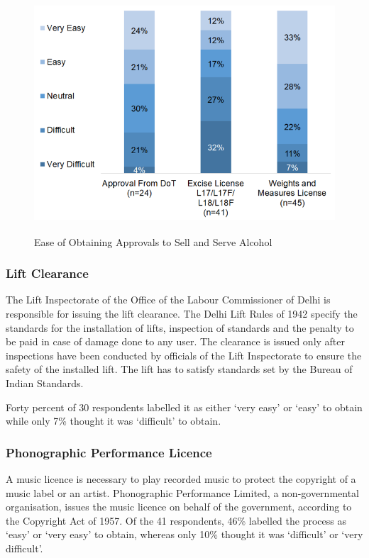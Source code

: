 \documentclass[a4paper, 12pt, twoside]{article}
\begin{document}
		\begin{figure}[H]
                    	\centering
                    	\includegraphics[height = 3.5in]{Figure4.png}
                    	\captionsetup{justification=centering}\caption[Optional Caption]{Ease of Obtaining Approvals to Sell and Serve Alcohol}
		\end{figure}

		\subsubsection{Lift Clearance}
		The Lift Inspectorate of the Office of the Labour Commissioner of Delhi is responsible for issuing the lift clearance. The Delhi Lift Rules of 1942 specify the standards for the installation of lifts, inspection of standards and the penalty to be paid in case of 
damage done to any user. The clearance is issued only after inspections have been conducted by officials of the Lift Inspectorate to ensure the safety of the installed lift. The lift has to satisfy standards set by the Bureau of Indian Standards.
		
		Forty percent of 30 respondents labelled it as either ‘very easy’ or ‘easy’ to obtain while only 7\% thought it was ‘difficult’ to obtain. %
		
		\subsubsection{Phonographic Performance Licence}
		A music licence is necessary to play recorded music to protect the copyright of a music label or an artist. Phonographic Performance Limited, a non-governmental organisation, issues the music licence on behalf of the government, according to the 
Copyright Act of 1957. Of the 41 respondents, 46\% labelled the process as ‘easy’ or ‘very easy’ to obtain, whereas only 10\% thought it was ‘difficult’ or ‘very difficult’.\\
		
\end{document}
